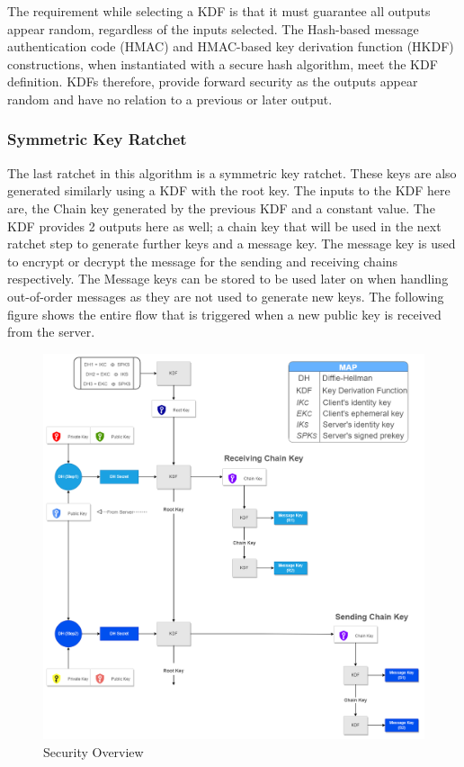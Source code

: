 The requirement while selecting a KDF is that it must guarantee all outputs appear random, regardless of the inputs selected. The Hash-based message authentication code (HMAC) and HMAC-based key derivation function (HKDF) constructions, when instantiated with a secure hash algorithm, meet the KDF definition. KDFs therefore, provide forward security as the outputs appear random and have no relation to a previous or later output.

\subsubsection{Symmetric Key Ratchet}
The last ratchet in this algorithm is a symmetric key ratchet. These keys are also generated similarly using a KDF with the root key. The inputs to the KDF here are, the Chain key generated by the previous KDF and a constant value. The KDF provides 2 outputs here as well; a chain key that will be used in the next ratchet step to generate further keys and a message key. The message key is used to encrypt or decrypt the message for the sending and receiving chains respectively. The Message keys can be stored to be used later on when handling out-of-order messages as they are not used to generate new keys. The following figure shows the entire flow that is triggered when a new public key is received from the server. 

\begin{figure}[ht!]
\centering
\includegraphics[width= 150mm]{./images/security_overview1-Overview.png}
\caption{Security Overview}
\end{figure}

